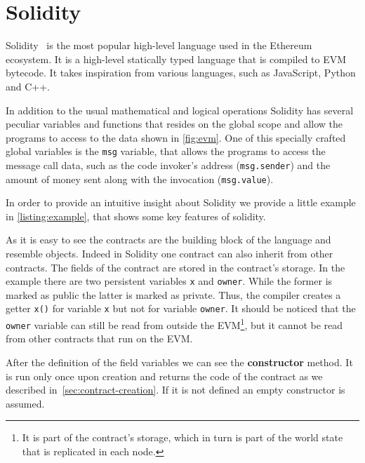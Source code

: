 \section{Solidity}
\label{sec:solidity}
Solidity~\cite{bib:solidity-docs} is the most popular
high-level language used in the Ethereum ecosystem.
It is a high-level statically typed language that is compiled to EVM bytecode.
It takes inspiration from various languages, such as JavaScript, Python and C++.

In addition to the usual mathematical and logical operations Solidity has
several peculiar variables and functions that resides on the global scope and
allow the programs to access to the data shown in \autoref{fig:evm}.
One of this specially crafted global variables is the \texttt{msg} variable,
that allows the programs to access the message call data,
such as the code invoker's address (\texttt{msg.sender}) and the amount of
money sent along with the invocation (\texttt{msg.value}).

In order to provide an intuitive insight about Solidity we provide a little
example in \autoref{listing:example}, that shows some key features of solidity.

\begin{figure}[!h]

\end{figure}

As it is easy to see the contracts are the building block of the language and
resemble objects. Indeed in Solidity one contract can also inherit from other
contracts.
The fields of the contract are stored in the contract's storage. In the example
there are two persistent variables \verb|x| and \verb|owner|. While the former
is marked as public the latter is marked as private. Thus, the compiler
creates a getter \verb|x()| for variable \verb|x| but not for variable
\verb|owner|. It should be noticed that the \verb|owner| variable can still
be read from outside the EVM\footnote{It is part of the contract's storage,
which in turn is part of the world state that is replicated in each node.},
but it cannot be read from other contracts that run on the EVM.


After the definition of the field variables we can see the \textbf{constructor}
method. It is run only once upon creation and returns the code of the contract
as we described in~\autoref{sec:contract-creation}. If it is not defined
an empty constructor is assumed.


